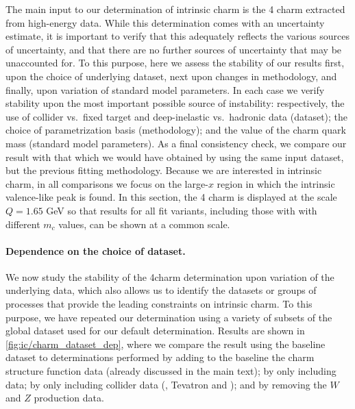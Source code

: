 
The main input to our determination of intrinsic charm is the 4\fns
charm \pdf extracted from high-energy data. While this
determination comes with an uncertainty estimate, it is important to
verify that this adequately reflects the various sources
of uncertainty, and that there are no further sources of uncertainty
that may be unaccounted for.
%
To this purpose, here we assess the
stability of our results first, upon the choice of underlying dataset,
next upon changes in methodology, and finally, upon variation of
standard model parameters.
%
In each case we verify stability upon the
most important possible source of instability: respectively, the use
of collider vs.\ fixed target and deep-inelastic vs.\ hadronic data
(dataset); the choice of parametrization basis (methodology); and the
value of the charm quark mass (standard model parameters).
%
As a final consistency check, we compare our result with that which we
would have obtained by using the same input dataset, but the previous
 fitting methodology.
%
Because we
are interested in intrinsic charm, in all comparisons we focus on
the large-$x$ region in which the intrinsic valence-like peak is found.
%
In this section, the 4\fns
charm \pdf is displayed at the scale $Q = 1.65$ GeV so that
results for all fit variants, including
those with with different $m_c$ values, can be shown at a common scale.

\paragraph{Dependence on the choice of dataset.}
%
We now study the stability of the  4\fns charm determination upon
variation of the
underlying data, which also allows us to
identify the datasets or groups of processes that provide
the leading constraints on intrinsic charm.
%
To this purpose, we have repeated our \pdf
determination using a  variety of subsets of the global dataset used for
our default determination. Results are shown in
\cref{fig:ic/charm_dataset_dep}, where we compare the result using
the 
baseline dataset to determinations performed by adding to the baseline
the  \emc charm
structure function data (already discussed in the main text); by only
including  \dis data; by only including collider data (\hera,
Tevatron and \lhc); and by removing the \lhcb  $W$ and $Z$ production data.


